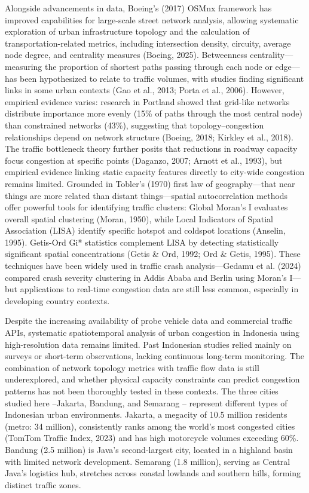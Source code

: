 \documentclass[12pt,a4paper]{article}
\begin{document}
Alongside advancements in data, Boeing's (2017) OSMnx framework has improved capabilities for large-scale street network analysis, allowing systematic exploration of urban infrastructure topology and the calculation of transportation-related metrics, including intersection density, circuity, average node degree, and centrality measures (Boeing, 2025). Betweenness centrality---measuring the proportion of shortest paths passing through each node or edge---has been hypothesized to relate to traffic volumes, with studies finding significant links in some urban contexts (Gao et al., 2013; Porta et al., 2006). However, empirical evidence varies: research in Portland showed that grid-like networks distribute importance more evenly (15\% of paths through the most central node) than constrained networks (43\%), suggesting that topology--congestion relationships depend on network structure (Boeing, 2018; Kirkley et al., 2018). The traffic bottleneck theory further posits that reductions in roadway capacity focus congestion at specific points (Daganzo, 2007; Arnott et al., 1993), but empirical evidence linking static capacity features directly to city-wide congestion remains limited. Grounded in Tobler's (1970) first law of geography---that near things are more related than distant things---spatial autocorrelation methods offer powerful tools for identifying traffic clusters: Global Moran's I evaluates overall spatial clustering (Moran, 1950), while Local Indicators of Spatial Association (LISA) identify specific hotspot and coldspot locations (Anselin, 1995). Getis-Ord Gi* statistics complement LISA by detecting statistically significant spatial concentrations (Getis \& Ord, 1992; Ord \& Getis, 1995). These techniques have been widely used in traffic crash analysis---Gedamu et al. (2024) compared crash severity clustering in Addis Ababa and Berlin using Moran's I---but applications to real-time congestion data are still less common, especially in developing country contexts.

Despite the increasing availability of probe vehicle data and commercial traffic APIs, systematic spatiotemporal analysis of urban congestion in Indonesia using high-resolution data remains limited. Past Indonesian studies relied mainly on surveys or short-term observations, lacking continuous long-term monitoring. The combination of network topology metrics with traffic flow data is still underexplored, and whether physical capacity constraints can predict congestion patterns has not been thoroughly tested in these contexts. The three cities studied here --Jakarta, Bandung, and Semarang -- represent different types of Indonesian urban environments. Jakarta, a megacity of 10.5 million residents (metro: 34 million), consistently ranks among the world's most congested cities (TomTom Traffic Index, 2023) and has high motorcycle volumes exceeding 60\%. Bandung (2.5 million) is Java's second-largest city, located in a highland basin with limited network development. Semarang (1.8 million), serving as Central Java's logistics hub, stretches across coastal lowlands and southern hills, forming distinct traffic zones.
\end{document}
